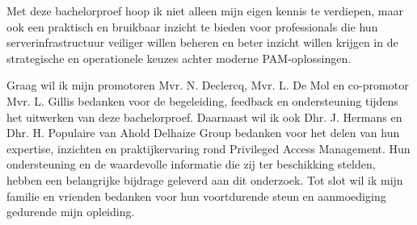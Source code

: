 Met deze bachelorproef hoop ik niet alleen mijn eigen kennis te verdiepen, maar ook een praktisch en bruikbaar inzicht te bieden voor professionals die hun serverinfrastructuur veiliger willen beheren en beter inzicht willen krijgen in de strategische en operationele keuzes achter moderne PAM-oplossingen.

Graag wil ik mijn promotoren Mvr. N. Declercq, Mvr. L. De Mol en co-promotor Mvr. L. Gillis bedanken voor de begeleiding, feedback en ondersteuning tijdens het uitwerken van deze bachelorproef.  Daarnaast wil ik ook Dhr. J. Hermans en Dhr. H. Populaire van Ahold Delhaize Group bedanken voor het delen van hun expertise, inzichten en praktijkervaring rond Privileged Access Management. Hun ondersteuning en de waardevolle informatie die zij ter beschikking stelden, hebben een belangrijke bijdrage geleverd aan dit onderzoek. Tot slot wil ik mijn familie en vrienden bedanken voor hun voortdurende steun en aanmoediging gedurende mijn opleiding.



